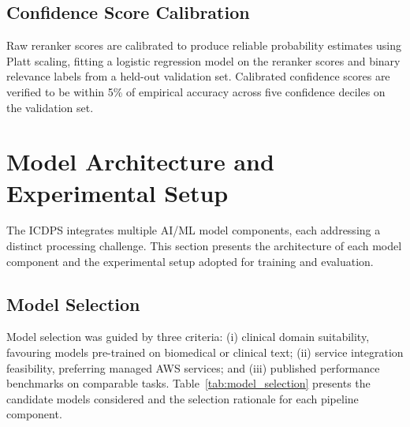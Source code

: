 \subsection{Confidence Score Calibration}
Raw reranker scores are calibrated to produce reliable probability estimates using Platt scaling, fitting a logistic regression model on the reranker scores and binary relevance labels from a held-out validation set. Calibrated confidence scores are verified to be within 5\% of empirical accuracy across five confidence deciles on the validation set.

\section{Model Architecture and Experimental Setup}

The ICDPS integrates multiple AI/ML model components, each addressing a distinct processing challenge. This section presents the architecture of each model component and the experimental setup adopted for training and evaluation.

\subsection{Model Selection}
Model selection was guided by three criteria: (i) clinical domain suitability, favouring models pre-trained on biomedical or clinical text; (ii) service integration feasibility, preferring managed AWS services; and (iii) published performance benchmarks on comparable tasks. Table~\ref{tab:model_selection} presents the candidate models considered and the selection rationale for each pipeline component.

